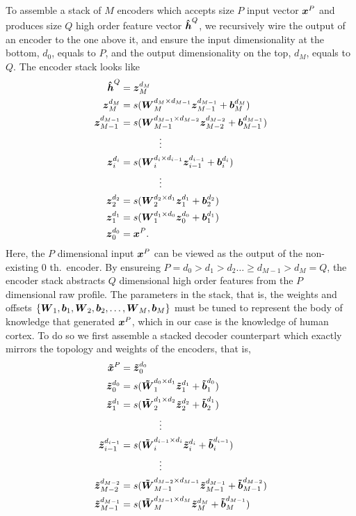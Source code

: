 To assemble a stack of $M$ encoders which accepts size $P$ input vector $\boldsymbol{x}^P$ and produces size $Q$ high order feature vector $\boldsymbol{\hat{h}}^Q$, we recursively wire the output of an encoder to the one above it, and ensure the input dimensionality at the bottom, $d_0$, equals to $P$, and the output dimensionality on the top, $d_M$, equals to $Q$. The encoder stack looks like
\begin{equation} \label{eq:SE}
  \begin{split}
    \boldsymbol{\hat{h}}^Q &= \boldsymbol{z}_{M}^{d_{M}} \\
    \boldsymbol{z}_{M  }^{d_{M  }} &= s(\boldsymbol{W}_{M  }^{d_{M  } \times d_{M-1}} \boldsymbol{z}_{M-1}^{d_{M-1}} + \boldsymbol{b}_{M  }^{d_{M  }}) \\
    \boldsymbol{z}_{M-1}^{d_{M-1}} &= s(\boldsymbol{W}_{M-1}^{d_{M-1} \times d_{M-2}} \boldsymbol{z}_{M-2}^{d_{M-2}} + \boldsymbol{b}_{M-1}^{d_{M-1}}) \\
    & \quad \quad \quad \quad \vdots \\
    \boldsymbol{z}_{i  }^{d_{i  }} &= s(\boldsymbol{W}_{i  }^{d_{i  } \times d_{i-1}} \boldsymbol{z}_{i-1}^{d_{i-1}} + \boldsymbol{b}_{i  }^{d_{i  }}) \\
    & \quad \quad \quad \quad \vdots \\
    \boldsymbol{z}_{2  }^{d_{2  }} &= s(\boldsymbol{W}_{2  }^{d_{2  } \times d_{1  }} \boldsymbol{z}_{1  }^{d_{1  }} + \boldsymbol{b}_{2  }^{d_{2  }}) \\
    \boldsymbol{z}_{1  }^{d_{1  }} &= s(\boldsymbol{W}_{1  }^{d_{1  } \times d_{0  }} \boldsymbol{z}_{0  }^{d_{0  }} + \boldsymbol{b}_{1  }^{d_{1  }}) \\
    \boldsymbol{z}_{0  }^{d_{0  }} &= \boldsymbol{x}^P.
  \end{split}
\end{equation}
Here, the $P$ dimensional input $\boldsymbol{x}^P$ can be viewed as the output of the non-existing $0$ th.\ encoder. By ensureing $P = d_0 > d_1 > d_2 \dots \ge d_{M-1} > d_M = Q$, the encoder stack abstracts $Q$ dimensional high order features from the $P$ dimensional raw profile.
The parameters in the stack, that is, the weights and offsets $\{\boldsymbol{W}_1, \boldsymbol{b}_1, \boldsymbol{W}_2, \boldsymbol{b}_2, \dots, \boldsymbol{W}_M, \boldsymbol{b}_M\}$ must be tuned to represent the body of knowledge that generated $\boldsymbol{x}^P$, which in our case is the knowledge of human cortex. To do so we first assemble a stacked decoder counterpart which exactly mirrors the topology and weights of the encoders, that is,
\begin{equation} \label{eq:SD}
  \begin{split}
    \boldsymbol{\tilde{x}}^P &= \boldsymbol{\tilde{z}}_{0}^{d_{0}} \\
    \boldsymbol{\tilde{z}}_{0  }^{d_{0  }} &= s(\boldsymbol{\tilde{W}}_{1  }^{d_{0  } \times d_{1  }} \boldsymbol{\tilde{z}}_{1  }^{d_{1  }} + \boldsymbol{\tilde{b}}_{1  }^{d_{0  }}) \\
    \boldsymbol{\tilde{z}}_{1  }^{d_{1  }} &= s(\boldsymbol{\tilde{W}}_{2  }^{d_{1  } \times d_{2  }} \boldsymbol{\tilde{z}}_{2  }^{d_{2  }} + \boldsymbol{\tilde{b}}_{2  }^{d_{1  }}) \\
    & \quad \quad \quad \quad \vdots \\
    \boldsymbol{\tilde{z}}_{i-1}^{d_{i-1}} &= s(\boldsymbol{\tilde{W}}_{i  }^{d_{i-1} \times d_{i  }} \boldsymbol{\tilde{z}}_{i  }^{d_{i  }} + \boldsymbol{\tilde{b}}_{i  }^{d_{i-1}}) \\
    & \quad \quad \quad \quad \vdots \\
    \boldsymbol{\tilde{z}}_{M-2}^{d_{M-2}} &= s(\boldsymbol{\tilde{W}}_{M-1}^{d_{M-2} \times d_{M-1}} \boldsymbol{\tilde{z}}_{M-1}^{d_{M-1}} + \boldsymbol{\tilde{b}}_{M-1}^{d_{M-2}}) \\
    \boldsymbol{\tilde{z}}_{M-1}^{d_{M-1}} &= s(\boldsymbol{\tilde{W}}_{M  }^{d_{M-1} \times d_{M  }} \boldsymbol{\tilde{z}}_{M  }^{d_{M  }} + \boldsymbol{\tilde{b}}_{M  }^{d_{M-1}}) \\
  \end{split}
\end{equation}
